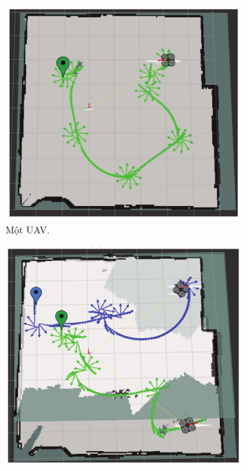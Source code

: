 \documentclass[11pt,openany]{book}
\begin{document}
\begin{figure}[H]
    \centering
    \begin{subfigure}[H]{0.5\linewidth}
        \includegraphics[width=\linewidth]{assets/3_16_a.png}
        \caption{{Một UAV.}}
        \label{fig:3.16a}
    \end{subfigure}
    \begin{subfigure}[H]{0.5\linewidth}
        \includegraphics[width=\linewidth]{assets/3_16_b.png}

\end{subfigure}
\end{figure}
\end{document}
